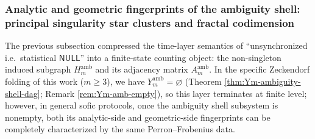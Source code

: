 \subsubsection{Analytic and geometric fingerprints of the ambiguity shell: principal singularity star clusters and fractal codimension}\label{subsubsec:Ym-ambiguity-analytic-geometry}
The previous subsection compressed the time-layer semantics of ``unsynchronized i.e.\ statistical \(\mathsf{NULL}\)'' into a finite-state counting object: the non-singleton induced subgraph \(H_m^{\mathrm{amb}}\) and its adjacency matrix \(A_m^{\mathrm{amb}}\).
In the specific Zeckendorf folding of this work (\(m\ge 3\)), we have \(Y_m^{\mathrm{amb}}=\varnothing\) (Theorem \ref{thm:Ym-ambiguity-shell-dag}; Remark \ref{rem:Ym-amb-empty}), so this layer terminates at finite level;
however, in general sofic protocols, once the ambiguity shell subsystem is nonempty, both its analytic-side and geometric-side fingerprints can be completely characterized by the same Perron--Frobenius data.

